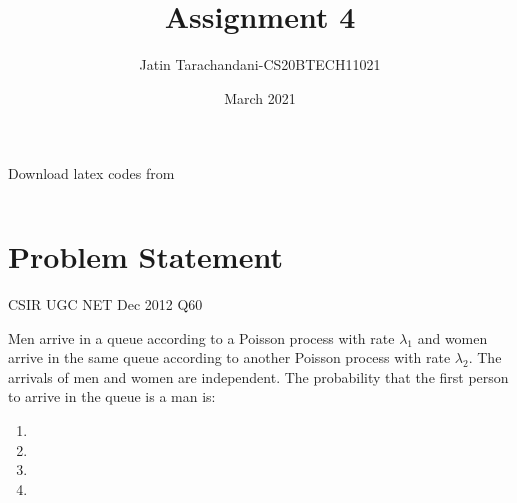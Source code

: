 \documentclass[twocolumn]{article}
\title{Assignment 4}
\author{Jatin Tarachandani-CS20BTECH11021}
\date{March 2021}
\theoremstyle{remark}
\numberwithin{equation}{subsection}
\begin{document}
\maketitle
Download latex codes from 
%
\begin{lstlisting}

\end{lstlisting}
\section{Problem Statement}
CSIR UGC NET Dec 2012 Q60

Men arrive in a queue according to a Poisson process with rate $\lambda_1$ and women arrive in the same queue according to another Poisson process with rate $\lambda_2$. The arrivals of men and women are independent. The probability that the first person to arrive in the queue is a man is:
\begin{enumerate}
\item {}

\item {}

\item {}

\item {} 
    
\end{enumerate}
\end{document}
